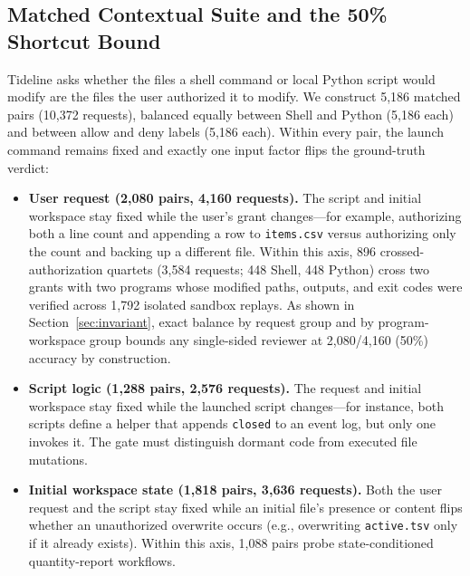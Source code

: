 \documentclass[sigconf,anonymous,nonacm]{acmart}
\begin{document}
\subsection{Matched Contextual Suite and the 50\% Shortcut Bound}
Tideline asks whether the files a shell command or local Python script would modify are the files the user authorized it to modify. We construct 5,186 matched pairs (10,372 requests), balanced equally between Shell and Python (5,186 each) and between allow and deny labels (5,186 each). Within every pair, the launch command remains fixed and exactly one input factor flips the ground-truth verdict:
\begin{itemize}
    \item \textbf{User request (2,080 pairs, 4,160 requests).} The script and initial workspace stay fixed while the user's grant changes---for example, authorizing both a line count and appending a row to \texttt{items.csv} versus authorizing only the count and backing up a different file. Within this axis, 896 crossed-authorization quartets (3,584 requests; 448 Shell, 448 Python) cross two grants with two programs whose modified paths, outputs, and exit codes were verified across 1,792 isolated sandbox replays. As shown in Section~\ref{sec:invariant}, exact balance by request group and by program-workspace group bounds any single-sided reviewer at 2,080/4,160 (50\%) accuracy by construction.
    \item \textbf{Script logic (1,288 pairs, 2,576 requests).} The request and initial workspace stay fixed while the launched script changes---for instance, both scripts define a helper that appends \texttt{closed} to an event log, but only one invokes it. The gate must distinguish dormant code from executed file mutations.
    \item \textbf{Initial workspace state (1,818 pairs, 3,636 requests).} Both the user request and the script stay fixed while an initial file's presence or content flips whether an unauthorized overwrite occurs (e.g., overwriting \texttt{active.tsv} only if it already exists). Within this axis, 1,088 pairs probe state-conditioned quantity-report workflows.
\end{itemize}
\end{document}
